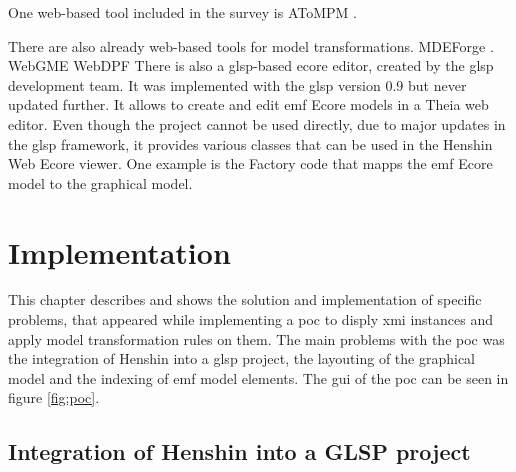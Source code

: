 \documentclass[conference,onecolumn]{IEEEtran}
\begin{document}
  One web-based tool included in the survey is \ac{AToMPM} \cite{atompm}. 


  There are also already web-based tools for model transformations. MDEForge \cite{mdeforge-repo}.
  WebGME \cite{webGME}
  WebDPF\cite{WebDPF}
  There is also a \ac{glsp}-based ecore editor, created by the \ac{glsp} development team. It was implemented with the \ac{glsp} version 0.9 but never updated further. It allows to create and edit \ac{emf} Ecore models in a Theia web editor. Even though the project cannot be used directly, due to major updates in the \ac{glsp} framework, it provides various classes that can be used in the Henshin Web Ecore viewer. One example is the Factory code that mapps the \ac{emf} Ecore model to the graphical model. \cite{glsp-ecore-repo}

  \section{Implementation}
  \label{subsec:implementation}
  This chapter describes and shows the solution and implementation of specific problems, that appeared while implementing a \ac{poc} to disply \ac{xmi} instances and apply model transformation rules on them. The main problems with the \ac{poc} was the integration of Henshin into a \ac{glsp} project, the layouting of the graphical model and the indexing of \ac{emf} model elements. The \acs{gui} of the \ac{poc} can be seen in figure \ref{fig:poc}.

  \subsection{Integration of Henshin into a GLSP project} 
  \label{subsec:henshin-glsp}
\end{document}
